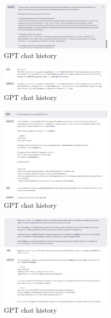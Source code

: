 \documentclass{article}
\begin{document}
\begin{figure}
    \centering
    \includegraphics[width=0.5\textwidth]{report_data/g-4.png}
    \caption{GPT chat history}
\end{figure}


\begin{figure}
    \centering
    \includegraphics[width=0.5\textwidth]{report_data/g-5.png}
    \caption{GPT chat history}
\end{figure}


\begin{figure}
    \centering
    \includegraphics[width=0.5\textwidth]{report_data/g-6.png}
    \caption{GPT chat history}
\end{figure}


\begin{figure}
    \centering
    \includegraphics[width=0.5\textwidth]{report_data/g-7.png}
    \caption{GPT chat history}
\end{figure}
\end{document}

